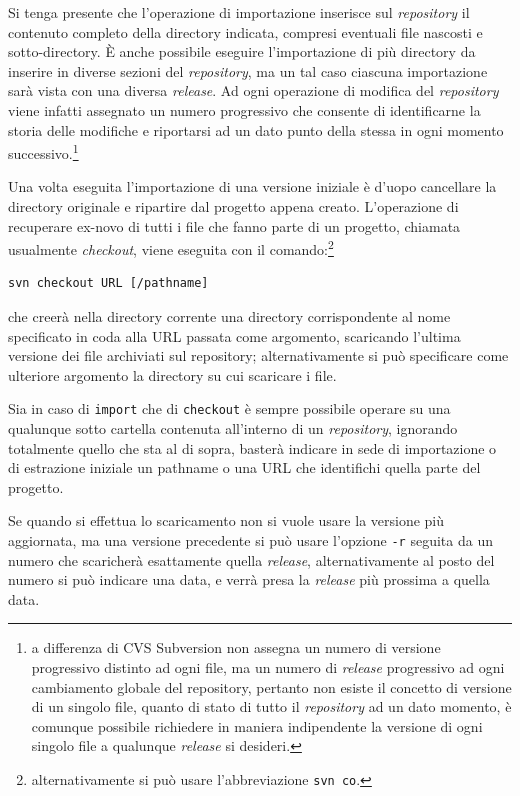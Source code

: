 Si tenga presente che l'operazione di importazione inserisce sul
\textit{repository} il contenuto completo della directory indicata, compresi
eventuali file nascosti e sotto-directory. È anche possibile eseguire
l'importazione di più directory da inserire in diverse sezioni del
\textit{repository}, ma un tal caso ciascuna importazione sarà vista con una
diversa \textit{release}. Ad ogni operazione di modifica del
\textit{repository} viene infatti assegnato un numero progressivo che consente
di identificarne la storia delle modifiche e riportarsi ad un dato punto della
stessa in ogni momento successivo.\footnote{a differenza di CVS Subversion non
  assegna un numero di versione progressivo distinto ad ogni file, ma un
  numero di \textit{release} progressivo ad ogni cambiamento globale del
  repository, pertanto non esiste il concetto di versione di un singolo file,
  quanto di stato di tutto il \textit{repository} ad un dato momento, è
  comunque possibile richiedere in maniera indipendente la versione di ogni
  singolo file a qualunque \textit{release} si desideri.}

Una volta eseguita l'importazione di una versione iniziale è d'uopo cancellare
la directory originale e ripartire dal progetto appena creato. L'operazione di
recuperare ex-novo di tutti i file che fanno parte di un progetto, chiamata
usualmente \textit{checkout}, viene eseguita con il
comando:\footnote{alternativamente si può usare l'abbreviazione \texttt{svn
    co}.}
\begin{verbatim}
svn checkout URL [/pathname]
\end{verbatim}
che creerà nella directory corrente una directory corrispondente al nome
specificato in coda alla URL passata come argomento, scaricando l'ultima
versione dei file archiviati sul repository; alternativamente si può
specificare come ulteriore argomento la directory su cui scaricare i file.

Sia in caso di \texttt{import} che di \texttt{checkout} è sempre possibile
operare su una qualunque sotto cartella contenuta all'interno di un
\textit{repository}, ignorando totalmente quello che sta al di sopra, basterà
indicare in sede di importazione o di estrazione iniziale un pathname o una
URL che identifichi quella parte del progetto.

Se quando si effettua lo scaricamento non si vuole usare la versione più
aggiornata, ma una versione precedente si può usare l'opzione \texttt{-r}
seguita da un numero che scaricherà esattamente quella \textit{release},
alternativamente al posto del numero si può indicare una data, e verrà presa
la \textit{release} più prossima a quella data. 

